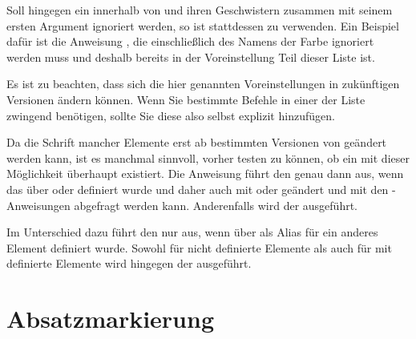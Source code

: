Soll hingegen ein  innerhalb von
 und ihren Geschwistern zusammen mit
seinem ersten Argument ignoriert werden, so ist stattdessen
 zu verwenden. Ein Beispiel dafür ist die
Anweisung , die einschließlich des Namens der Farbe ignoriert
werden muss und deshalb bereits in der Voreinstellung Teil dieser Liste ist.

Es ist zu beachten, dass sich die hier genannten Voreinstellungen in
zukünftigen Versionen ändern können. Wenn Sie bestimmte Befehle in einer der
Liste zwingend benötigen, sollte Sie diese also selbst explizit hinzufügen.%
\EndIndexGroup


\begin{Declaration}
\end{Declaration}
Da die Schrift mancher Elemente erst ab
bestimmten Versionen von \KOMAScript{} geändert werden kann, ist es manchmal
sinnvoll, vorher testen zu können, ob ein  mit dieser
Möglichkeit überhaupt existiert. Die Anweisung  führt
den  genau dann aus, wenn das  über
 oder
 definiert wurde und daher auch mit
 oder 
geändert und mit den -Anweisungen abgefragt werden
kann. Anderenfalls wird der  ausgeführt.

Im Unterschied dazu führt
 den
 nur aus, wenn  über
 als Alias für ein anderes Element
definiert wurde. Sowohl für nicht definierte Elemente als auch für mit
 definierte Elemente wird hingegen der
 ausgeführt.%
\EndIndexGroup


\section{Absatzmarkierung}

